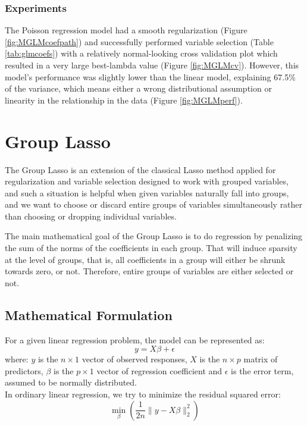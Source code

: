 \documentclass[a4paper, 11pt]{article}
\begin{document}
\begin{multicols}{2}
\subsubsection*{Experiments}
The Poisson regression model had a smooth regularization (Figure \ref{fig:MGLMcoefpath}) and successfully performed variable selection (Table \ref{tab:glmcoefs}) with a relatively normal-looking cross validation plot which resulted in a very large best-lambda value (Figure \ref{fig:MGLMcv}). However, this model's performance was slightly lower than the linear model, explaining 67.5\% of the variance, which means either a wrong distributional assumption or linearity in the relationship in the data (Figure \ref{fig:MGLMperf}). 


\section{Group Lasso} \vspace{-7pt}
The Group Lasso is an extension of the classical Lasso method applied for regularization and variable selection designed to work with grouped variables, and such a situation is helpful when given variables naturally fall into groups, and we want to choose or discard entire groups of variables simultaneously rather than choosing or dropping individual variables.

The main mathematical goal of the Group Lasso is to do regression by penalizing the sum of the norms of the coefficients in each group. That will induce sparsity at the level of groups, that is, all coefficients in a group will either be shrunk towards zero, or not. Therefore, entire groups of variables are either selected or not.

\subsection{Mathematical Formulation} \vspace{-3pt}
For a given linear regression problem, the model can be represented as:
\begin{equation}
y=X\beta + \epsilon
\end{equation}
where: $y$ is the $n \times 1$ vector of observed responses, $X$ is the $n \times p$ matrix of predictors, $\beta$ is the $p \times 1$ vector of regression coefficient and $\epsilon$ is the error term, assumed to be normally distributed.\\

In ordinary linear regression, we try to minimize the residual squared error: \begin{equation} \min_{\beta}\left (\frac{1}{2n}\lVert y-X\beta\rVert^{2}_{2} \right) 
\end{equation}


\end{multicols}
\end{document}
